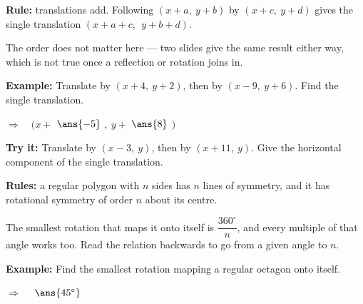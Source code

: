 \documentclass[12pt]{article}
\begin{document}


\begin{formulabox}
\textbf{Rule:} translations add. Following $(x + a,\ y + b)$ by $(x + c,\ y + d)$ gives the single translation $(x + a + c,\ \ y + b + d)$.\par
The order does not matter here --- two slides give the same result either way, which is not true once a reflection or rotation joins in.
\end{formulabox}

\begin{examplebox}
\textbf{Example:} \quad Translate by $(x + 4,\ y + 2)$, then by $(x - 9,\ y + 6)$. Find the single translation.

$\Rightarrow\quad (x + $ $\ans{-5}$ $,\ y + $ $\ans{8}$ $)$
\end{examplebox}

\begin{tryitbox}
\textbf{Try it:} \quad Translate by $(x - 3,\ y)$, then by $(x + 11,\ y)$. Give the horizontal component of the single translation.\\[2pt]
\end{tryitbox}


\begin{formulabox}
\textbf{Rules:} a regular polygon with $n$ sides has $n$ lines of symmetry, and it has rotational symmetry of order $n$ about its centre.\par
The smallest rotation that maps it onto itself is $\dfrac{360^\circ}{n}$, and every multiple of that angle works too. Read the relation backwards to go from a given angle to $n$.
\end{formulabox}

\begin{examplebox}
\textbf{Example:} \quad Find the smallest rotation mapping a regular octagon onto itself.

$\Rightarrow\quad$ $\ans{45^\circ}$
\end{examplebox}
\end{document}
